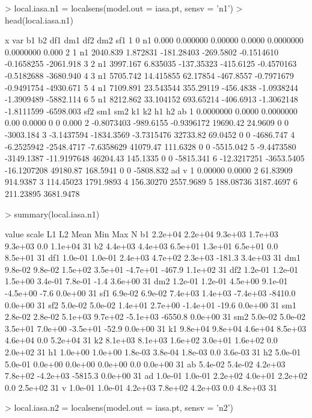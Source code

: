 \documentclass[a4paper]{article}
\begin{document}
\begin{Schunk}
\begin{Sinput}
> local.iasa.n1 = localsens(model.out = iasa.pt, sensv = 'n1')
> head(local.iasa.n1)
\end{Sinput}
\begin{Soutput}
  x var       b1        b2        df1       dm1        df2        dm2       sf1
1 0  n1    0.000  0.000000    0.00000    0.0000  0.0000000  0.0000000     0.000
2 1  n1 2040.839  1.872831 -181.28403 -269.5802 -0.1514610 -0.1658255 -2061.918
3 2  n1 3997.167  6.835035 -137.35323 -415.6125 -0.4570163 -0.5182688 -3680.940
4 3  n1 5705.742 14.415855   62.17854 -467.8557 -0.7971679 -0.9491754 -4930.671
5 4  n1 7109.891 23.543544  355.29119 -456.4838 -1.0938244 -1.3909489 -5882.114
6 5  n1 8212.862 33.104152  693.65214 -406.6913 -1.3062148 -1.8111599 -6598.003
          sf2        sm1         sm2       k1       k2 h1 h2        ab
1   0.0000000     0.0000   0.0000000     0.00   0.0000  0  0     0.000
2  -0.8073403  -989.6155  -0.9396172 19690.42  24.9609  0  0 -3003.184
3  -3.1437594 -1834.3569  -3.7315476 32733.82  69.0452  0  0 -4686.747
4  -6.2525942 -2548.4717  -7.6358629 41079.47 111.6328  0  0 -5515.042
5  -9.4473580 -3149.1387 -11.9197648 46204.43 145.1335  0  0 -5815.341
6 -12.3217251 -3653.5405 -16.1207208 49180.87 168.5941  0  0 -5808.832
         ad         v
1   0.00000    0.0000
2  61.83909  914.9387
3 114.45023 1791.9893
4 156.30270 2557.9689
5 188.08736 3187.4697
6 211.23895 3681.9478
\end{Soutput}
\begin{Sinput}
> summary(local.iasa.n1)
\end{Sinput}
\begin{Soutput}
      value   scale      L1      L2     Mean     Min     Max  N
b1  2.2e+04 2.2e+04 9.3e+03 1.7e+03  9.3e+03     0.0 1.1e+04 31
b2  4.4e+03 4.4e+03 6.5e+01 1.3e+01  6.5e+01     0.0 8.5e+01 31
df1 1.0e-01 1.0e-01 2.4e+03 4.7e+02  2.3e+03  -181.3 3.4e+03 31
dm1 9.8e-02 9.8e-02 1.5e+02 3.5e+01 -4.7e+01  -467.9 1.1e+02 31
df2 1.2e-01 1.2e-01 1.5e+00 3.4e-01  7.8e-01    -1.4 3.6e+00 31
dm2 1.2e-01 1.2e-01 4.5e+00 9.1e-01 -4.5e+00    -7.6 0.0e+00 31
sf1 6.9e-02 6.9e-02 7.4e+03 1.4e+03 -7.4e+03 -8410.0 0.0e+00 31
sf2 5.0e-02 5.0e-02 1.4e+01 2.7e+00 -1.4e+01   -19.6 0.0e+00 31
sm1 2.8e-02 2.8e-02 5.1e+03 9.7e+02 -5.1e+03 -6550.8 0.0e+00 31
sm2 5.0e-02 5.0e-02 3.5e+01 7.0e+00 -3.5e+01   -52.9 0.0e+00 31
k1  9.8e+04 9.8e+04 4.6e+04 8.5e+03  4.6e+04     0.0 5.2e+04 31
k2  8.1e+03 8.1e+03 1.6e+02 3.0e+01  1.6e+02     0.0 2.0e+02 31
h1  1.0e+00 1.0e+00 1.8e-03 3.8e-04  1.8e-03     0.0 3.6e-03 31
h2  5.0e-01 5.0e-01 0.0e+00 0.0e+00  0.0e+00     0.0 0.0e+00 31
ab  5.4e-02 5.4e-02 4.2e+03 7.8e+02 -4.2e+03 -5815.3 0.0e+00 31
ad  1.0e-01 1.0e-01 2.2e+02 4.0e+01  2.2e+02     0.0 2.5e+02 31
v   1.0e-01 1.0e-01 4.2e+03 7.8e+02  4.2e+03     0.0 4.8e+03 31
\end{Soutput}
\begin{Sinput}
> local.iasa.n2 = localsens(model.out = iasa.pt, sensv = 'n2')
\end{Sinput}
\end{Schunk}
\end{document}
